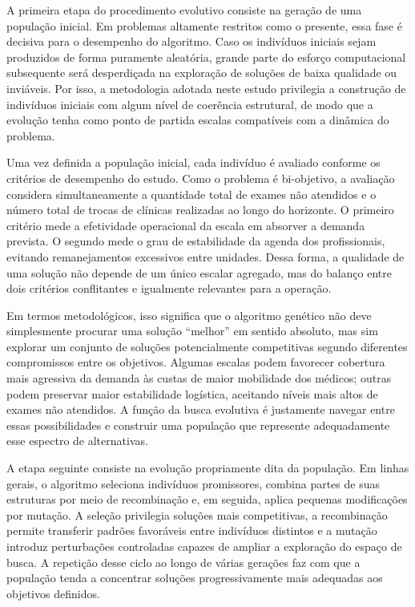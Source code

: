 A primeira etapa do procedimento evolutivo consiste na geração de uma população inicial. Em problemas altamente restritos como o presente, essa fase é decisiva para o desempenho do algoritmo. Caso os indivíduos iniciais sejam produzidos de forma puramente aleatória, grande parte do esforço computacional subsequente será desperdiçada na exploração de soluções de baixa qualidade ou inviáveis. Por isso, a metodologia adotada neste estudo privilegia a construção de indivíduos iniciais com algum nível de coerência estrutural, de modo que a evolução tenha como ponto de partida escalas compatíveis com a dinâmica do problema.

Uma vez definida a população inicial, cada indivíduo é avaliado conforme os critérios de desempenho do estudo. Como o problema é bi-objetivo, a avaliação considera simultaneamente a quantidade total de exames não atendidos e o número total de trocas de clínicas realizadas ao longo do horizonte. O primeiro critério mede a efetividade operacional da escala em absorver a demanda prevista. O segundo mede o grau de estabilidade da agenda dos profissionais, evitando remanejamentos excessivos entre unidades. Dessa forma, a qualidade de uma solução não depende de um único escalar agregado, mas do balanço entre dois critérios conflitantes e igualmente relevantes para a operação.

Em termos metodológicos, isso significa que o algoritmo genético não deve simplesmente procurar uma solução ``melhor'' em sentido absoluto, mas sim explorar um conjunto de soluções potencialmente competitivas segundo diferentes compromissos entre os objetivos. Algumas escalas podem favorecer cobertura mais agressiva da demanda às custas de maior mobilidade dos médicos; outras podem preservar maior estabilidade logística, aceitando níveis mais altos de exames não atendidos. A função da busca evolutiva é justamente navegar entre essas possibilidades e construir uma população que represente adequadamente esse espectro de alternativas.

A etapa seguinte consiste na evolução propriamente dita da população. Em linhas gerais, o algoritmo seleciona indivíduos promissores, combina partes de suas estruturas por meio de recombinação e, em seguida, aplica pequenas modificações por mutação. A seleção privilegia soluções mais competitivas, a recombinação permite transferir padrões favoráveis entre indivíduos distintos e a mutação introduz perturbações controladas capazes de ampliar a exploração do espaço de busca. A repetição desse ciclo ao longo de várias gerações faz com que a população tenda a concentrar soluções progressivamente mais adequadas aos objetivos definidos.

